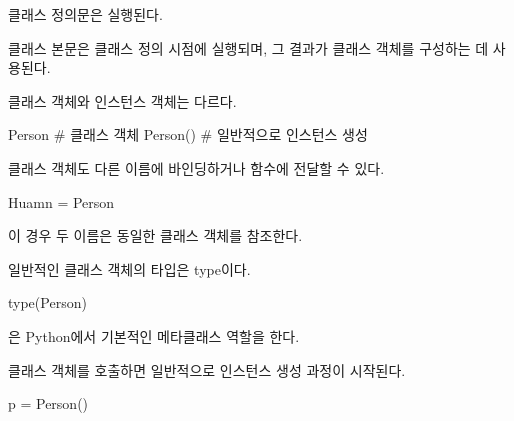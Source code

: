 \begin{dhknote}
\begin{dhksmry}[centered]
클래스 정의문은 실행된다.
\end{dhksmry}
\end{dhknote}

클래스 본문은 클래스 정의 시점에 실행되며, 그 결과가 클래스 객체를 구성하는 데 사용된다.

\begin{dhknote}
\begin{dhksmry}[centered]
클래스 객체와 인스턴스 객체는 다르다.
\end{dhksmry}
\end{dhknote}

\begin{dhkcode}
Person      # 클래스 객체
Person()    # 일반적으로 인스턴스 생성
\end{dhkcode}

\begin{dhknote}
\begin{dhksmry}[centered]
클래스 객체도 다른 이름에 바인딩하거나 함수에 전달할 수 있다.
\end{dhksmry}
\end{dhknote}

\begin{dhkcode}
Huamn = Person
\end{dhkcode}

이 경우 두 이름은 동일한 클래스 객체를 참조한다.

\begin{dhknote}
\begin{dhksmry}[centered]
일반적인 클래스 객체의 타입은 type이다.
\end{dhksmry}
\end{dhknote}

\begin{dhkcode}
type(Person)
\end{dhkcode}

은 Python에서 기본적인 메타클래스 역할을 한다.

\begin{dhknote}
\begin{dhksmry}[centered]
클래스 객체를 호출하면 일반적으로 인스턴스 생성 과정이 시작된다.
\end{dhksmry}
\end{dhknote}

\begin{dhkcode}
p = Person()
\end{dhkcode}

